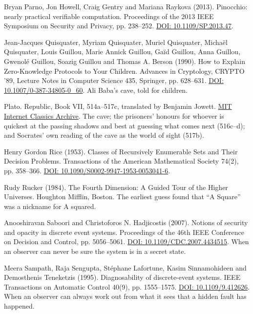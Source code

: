 \documentclass[11pt,twoside]{article}
\theoremstyle{thielethm}
\theoremstyle{thieledef}
\theoremstyle{thieledef}
\theoremstyle{thieledef}
\theoremstyle{thielethm}
\theoremstyle{thieleobs}
\theoremstyle{thielethm}
\begin{document}
\noindent Bryan Parno, Jon Howell, Craig Gentry and Mariana Raykova (2013). Pinocchio: nearly practical verifiable computation. Proceedings of the 2013 IEEE Symposium on Security and Privacy, pp. 238--252. \href{https://doi.org/10.1109/SP.2013.47}{DOI: 10.1109/SP.2013.47}.
\par\medskip

\noindent Jean-Jacques Quisquater, Myriam Quisquater, Muriel Quisquater, Micha\"el Quisquater, Louis Guillou, Marie Annick Guillou, Ga\"id Guillou, Anna Guillou, Gwenol\'e Guillou, Soazig Guillou and Thomas A. Berson (1990). How to Explain Zero-Knowledge Protocols to Your Children. Advances in Cryptology, CRYPTO '89, Lecture Notes in Computer Science 435, Springer, pp. 628--631. \href{https://doi.org/10.1007/0-387-34805-0_60}{DOI: 10.1007/0-387-34805-0\_60}. Ali Baba's cave, told for children.
\par\medskip

\noindent Plato. Republic, Book VII, 514a--517c, translated by Benjamin Jowett. \href{https://classics.mit.edu/Plato/republic.8.vii.html}{MIT Internet Classics Archive}. The cave; the prisoners' honours for whoever is quickest at the passing shadows and best at guessing what comes next (516c--d); and Socrates' own reading of the cave as the world of sight (517b).
\par\medskip

\noindent Henry Gordon Rice (1953). Classes of Recursively Enumerable Sets and Their Decision Problems. Transactions of the American Mathematical Society 74(2), pp. 358--366. \href{https://doi.org/10.1090/S0002-9947-1953-0053041-6}{DOI: 10.1090/S0002-9947-1953-0053041-6}.
\par\medskip

\noindent Rudy Rucker (1984). The Fourth Dimension: A Guided Tour of the Higher Universes. Houghton Mifflin, Boston. The earliest guess found that ``A Square'' was a nickname for A squared.
\par\medskip

\noindent Anooshiravan Saboori and Christoforos N. Hadjicostis (2007). Notions of security and opacity in discrete event systems. Proceedings of the 46th IEEE Conference on Decision and Control, pp. 5056--5061. \href{https://doi.org/10.1109/CDC.2007.4434515}{DOI: 10.1109/CDC.2007.4434515}. When an observer can never be sure the system is in a secret state.
\par\medskip

\noindent Meera Sampath, Raja Sengupta, St\'ephane Lafortune, Kasim Sinnamohideen and Demosthenis Teneketzis (1995). Diagnosability of discrete-event systems. IEEE Transactions on Automatic Control 40(9), pp. 1555--1575. \href{https://doi.org/10.1109/9.412626}{DOI: 10.1109/9.412626}. When an observer can always work out from what it sees that a hidden fault has happened.
\par\medskip
\end{document}
